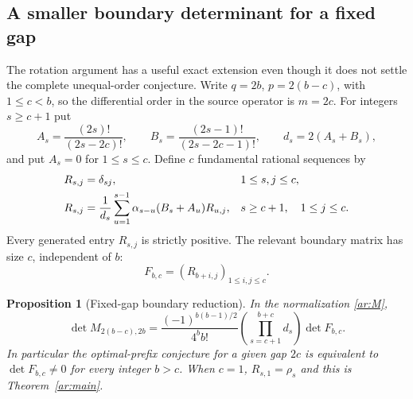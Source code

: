 \documentclass[11pt,a4paper]{article}
\numberwithin{equation}{section}
\newtheorem{proposition}[theorem]{Proposition}
\theoremstyle{definition}
\theoremstyle{remark}
\begin{document}
\subsection{A smaller boundary determinant for a fixed gap}
\label{ar:general-gap}

The rotation argument has a useful exact extension even though it does
not settle the complete unequal-order conjecture. Write
$q=2b$, $p=2(b-c)$, with $1\le c<b$, so the differential order in
the source operator is $m=2c$. For integers $s\ge c+1$ put
\[
 A_s=\frac{(2s)!}{(2s-2c)!},\qquad
 B_s=\frac{(2s-1)!}{(2s-2c-1)!},\qquad
 d_s=2(A_s+B_s),
\]
and put $A_s=0$ for $1\le s\le c$. Define $c$ fundamental rational
sequences by
\begin{align}
 R_{s,j}&=\delta_{sj},&&1\le s,j\le c,\notag\\
 R_{s,j}&=\frac1{d_s}\sum_{u=1}^{s-1}
       \alpha_{s-u}(B_s+A_u)R_{u,j},
       &&s\ge c+1,\quad 1\le j\le c.
       \label{ar:fundamental}
\end{align}
Every generated entry $R_{s,j}$ is strictly positive. The relevant
boundary matrix has size $c$, independent of $b$:
\[
             F_{b,c}=(R_{b+i,j})_{1\le i,j\le c}.
\]

\begin{proposition}[Fixed-gap boundary reduction]\label{ar:gap-det}
In the normalization \eqref{ar:M},
\begin{equation}\label{ar:gap-factor}
 \det M_{2(b-c),2b}
  =\frac{(-1)^{b(b-1)/2}}{4^bb!}
       \left(\prod_{s=c+1}^{b+c}d_s\right)\det F_{b,c}.
\end{equation}
In particular the optimal-prefix conjecture for a given gap $2c$
is equivalent to $\det F_{b,c}\ne0$ for every integer $b>c$.
When $c=1$, $R_{s,1}=\rho_s$ and this is
Theorem~\ref{ar:main}.
\end{proposition}
\end{document}
